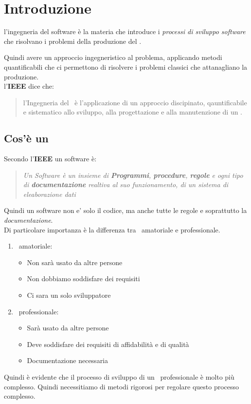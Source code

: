 \section{Introduzione}
l'ingegneria del software \`e la materia che introduce i \emph{processi di sviluppo software}
che risolvano i problemi della produzione del \sw .

Quindi avere un approccio ingegneristico al problema, applicando metodi quantificabili
che ci permettono di risolvere i problemi classici che attanagliano la produzione.
\\
l'\textbf{IEEE} dice che:
\begin{quote}
    l'Ingegneria del \sw\ \`e l'applicazione di un approccio discipinato, qauntificabile e sistematico allo sviluppo, alla progettazione e alla manutenzione di un \Sw.
\end{quote}
\subsection{Cos'\`e un \sw}
Secondo l'\textbf{IEEE} un software \`e:

\begin{quote}
    \textit{ Un Software \`e un insieme di \textbf{Programmi}, \textbf{procedure}, \textbf{regole} e ogni tipo di \textbf{documentazione} realtiva al suo funzionamento, di un sistema di eleaborazione dati} 
\end{quote}
Quindi un software non e' solo il codice, ma anche tutte le regole e soprattutto la \emph{documentazione}.
\\
Di particolare importanza \`e la differenza tra \sw\ amatoriale e professionale.
\begin{enumerate}
    \item \sw\ amatoriale: 
        \begin{itemize}
            \item Non sar\`a usato da altre persone
            \item Non dobbiamo soddisfare dei requisiti
            \item Ci sara un solo sviluppatore
        \end{itemize}
    \item \sw\ professionale:
        \begin{itemize}
            \item Sar\`a usato da altre persone
            \item Deve soddisfare dei requisiti di affidabilit\`a e di qualit\`a
            \item Documentazione necessaria
        \end{itemize}
\end{enumerate}
Quindi \`e evidente che il processo di sviluppo di un \sw\ professionale \`e molto pi\`u
complesso. Quindi necessitiamo di metodi rigorosi per regolare questo processo complesso.

